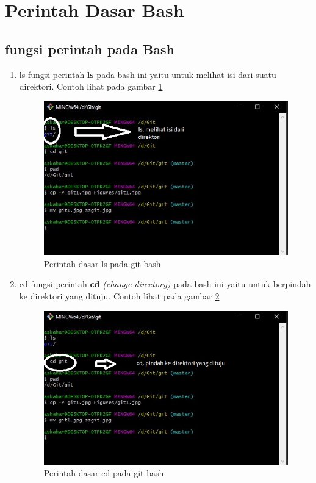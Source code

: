 \section{Perintah Dasar Bash}
\subsection{fungsi perintah pada Bash}

\begin{enumerate}
\item ls
	fungsi perintah \textbf{ls} pada bash ini yaitu untuk melihat isi dari suatu direktori. 
Contoh lihat pada gambar \ref{ls}
\begin{figure}[!htbp]
\centerline{\includegraphics[width=.75\textwidth]{Figures/ls.jpg}}
\caption{Perintah dasar ls pada git bash}
\label{ls}
\end{figure}

\item cd 
	fungsi perintah \textbf{cd} \textit{(change directory)} pada bash ini yaitu untuk berpindah ke direktori yang dituju.
Contoh lihat pada gambar \ref{cd}
\begin{figure}[!htbp]
\centerline{\includegraphics[width=.75\textwidth]{Figures/cd.jpg}}
\caption{Perintah dasar cd pada git bash}
\label{cd}
\end{figure}


\end{enumerate}

